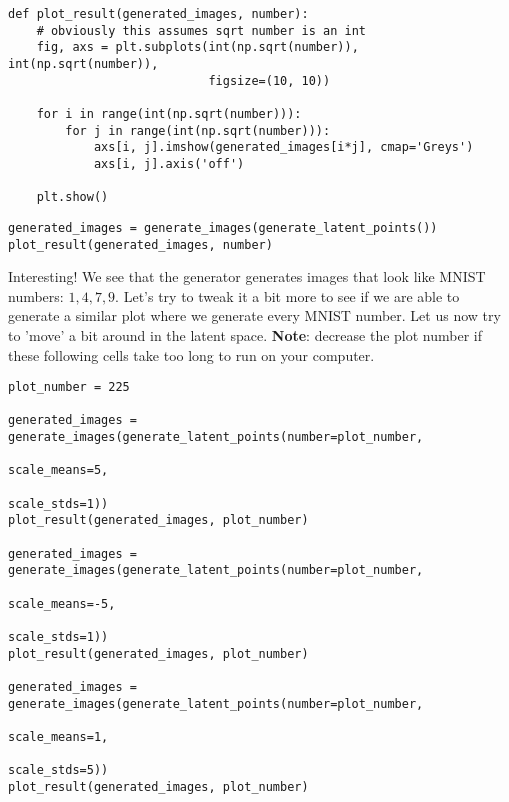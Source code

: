 \documentclass[%
oneside,                 %
final,                   %
10pt]{article}
\begin{document}
\begin{verbatim}
def plot_result(generated_images, number):
    # obviously this assumes sqrt number is an int
    fig, axs = plt.subplots(int(np.sqrt(number)), int(np.sqrt(number)),
                            figsize=(10, 10))

    for i in range(int(np.sqrt(number))):
        for j in range(int(np.sqrt(number))):
            axs[i, j].imshow(generated_images[i*j], cmap='Greys')
            axs[i, j].axis('off')

    plt.show()

\end{verbatim}





\begin{verbatim}
generated_images = generate_images(generate_latent_points())
plot_result(generated_images, number)

\end{verbatim}


Interesting! We see that the generator generates images that look like MNIST
numbers: $1, 4, 7, 9$. Let's try to tweak it a bit more to see if we are able
to generate a similar plot where we generate every MNIST number. Let us now try
to 'move' a bit around in the latent space. \textbf{Note}: decrease the plot number if
these following cells take too long to run on your computer.


















\begin{verbatim}
plot_number = 225

generated_images = generate_images(generate_latent_points(number=plot_number,
                                                          scale_means=5,
                                                          scale_stds=1))
plot_result(generated_images, plot_number)

generated_images = generate_images(generate_latent_points(number=plot_number,
                                                          scale_means=-5,
                                                          scale_stds=1))
plot_result(generated_images, plot_number)

generated_images = generate_images(generate_latent_points(number=plot_number,
                                                          scale_means=1,
                                                          scale_stds=5))
plot_result(generated_images, plot_number)

\end{verbatim}
\end{document}
